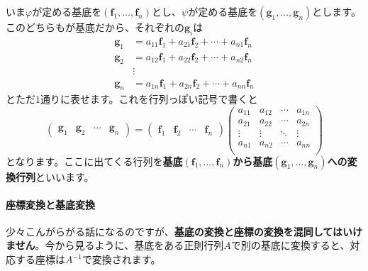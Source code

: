 いま$\varphi$が定める基底を$(\bm{f}_1, \ldots, \bm{f}_n)$とし、$\psi$が定める基底を$(\bm{g}_1, \ldots, \bm{g}_n)$とします。このどちらもが基底だから、それぞれの$\bm{g}_i$は
\begin{align*}
\bm{g}_1 &= a_{11} \bm{f}_1 + a_{21} \bm{f}_2 + \cdots + a_{n1} \bm{f}_n \\
\bm{g}_2 &= a_{12} \bm{f}_1 + a_{22} \bm{f}_2 + \cdots + a_{n2} \bm{f}_n \\
&\vdots \\
\bm{g}_n &= a_{1n} \bm{f}_1 + a_{2n} \bm{f}_2 + \cdots + a_{nn} \bm{f}_n
\end{align*}
とただ$1$通りに表せます。これを行列っぽい記号で書くと
\[
\begin{pmatrix}
\bm{g}_1 & \bm{g}_2 & \cdots & \bm{g}_n
\end{pmatrix}
=
\begin{pmatrix}
\bm{f}_1 & \bm{f}_2 & \cdots & \bm{f}_n
\end{pmatrix}
\begin{pmatrix}
a_{11} & a_{12} & \cdots & a_{1n} \\
a_{21} & a_{22} & \cdots & a_{2n} \\
\vdots & \vdots & \ddots & \vdots \\
a_{n1} & a_{n2} & \cdots & a_{nn} \\
\end{pmatrix}
\]
となります。ここに出てくる行列を\textbf{基底$(\bm{f}_1, \ldots, \bm{f}_n)$から基底$(\bm{g}_1, \ldots, \bm{g}_n)$への変換行列}といいます。

\paragraph{座標変換と基底変換}

少々こんがらがる話になるのですが、\textbf{基底の変換と座標の変換を混同してはいけません}。今から見るように、基底をある正則行列$A$で別の基底に変換すると、対応する座標は$A^{-1}$で変換されます。

